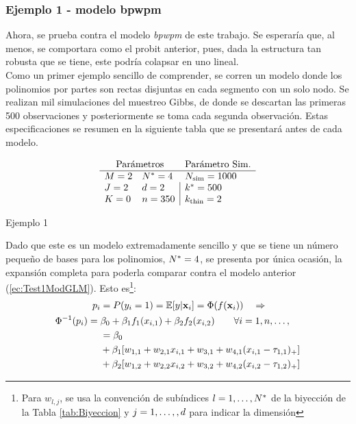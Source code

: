 \documentclass[../Main/Main.tex]{subfiles}
\begin{document}
\subsubsection*{Ejemplo 1 - modelo bpwpm} \label{sec:Test1Ej1}
Ahora, se prueba contra el modelo \textit{bpwpm} de este trabajo. Se esperaría que, al menos, se comportara como el probit anterior, pues, dada la estructura tan robusta que se tiene, este podría colapsar en uno lineal. \\

Como un primer ejemplo sencillo de comprender, se corren un modelo donde los polinomios por partes son rectas disjuntas en cada segmento con un solo nodo. Se realizan mil simulaciones del muestreo Gibbs, de donde se descartan las primeras 500 observaciones y posteriormente se toma cada segunda observación. Estas especificaciones se resumen en la siguiente tabla que se presentará antes de cada modelo. \\
\begin{table}[H]
$$\paramsmod{2}{2}{0}{4}{2}{350}{1000}{500}{2}$$
\caption*{Ejemplo 1}
\label{ej:1}
\end{table}
Dado que este es un modelo extremadamente sencillo y que se tiene un número pequeño de bases para los polinomios, $N^* = 4$, se presenta por única ocasión, la expansión completa para poderla comparar contra el modelo anterior (\ref{ec:Test1ModGLM}). Esto es\footnote{Para $w_{l,j}$, se usa la convención de subíndices $l = 1,\ldots,N^*$ de la biyección de la Tabla \ref{tab:Biyeccion} y $j = 1,\ldots,,{d}$ para indicar la dimensión}: 
\begin{align}
	p_i &= P(y_i = 1) =\mathbb{E}[y|\mathbf{x}_i] = \Phi(f(\mathbf{x}_i))  \quad \Rightarrow  			\nonumber \\
	\Phi^{-1}(p_i) = \;&\beta_0 + \beta_1f_1(x_{i,1}) + \beta_2f_2(x_{i,2}) 
	\qquad 	\forall i = 1,n,\ldots,\label{ec:Test1Ej1} \\
	&= \beta_0 \nonumber \\
	&+ \beta_1[w_{1,1} + w_{2,1}x_{i,1} + w_{3,1} + w_{4,1}(x_{i,1} - \tau_{1,1})_+] \label{ec:Test1Ej1F1}\\
	& +\beta_2[w_{1,2} + w_{2,2}x_{i,2} + w_{3,2} + w_{4,2}(x_{i,2} - \tau_{1,2})_+] \label{ec:Test1Ej1F2}
\end{align}
\end{document}
